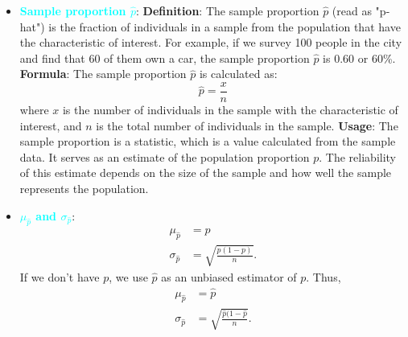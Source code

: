 \documentclass{report}
\begin{document}
\begin{itemize}
        \item \textbf{\textcolor{cyan}{Sample proportion $\hat{p}$}}:
            \textbf{Definition}: The sample proportion $\hat{p}$ (read as "p-hat") is the fraction of individuals in a sample from the population that have the characteristic of interest. For example, if we survey 100 people in the city and find that 60 of them own a car, the sample proportion $\hat{p}$ is 0.60 or 60\%.
            \bigbreak \noindent 
            \textbf{Formula}: The sample proportion $\hat{p}$ is calculated as:
            \[
                \hat{p} = \frac{x}{n}
            \]
            where $x$ is the number of individuals in the sample with the characteristic of interest, and $n$ is the total number of individuals in the sample.
            \bigbreak \noindent 
            \textbf{Usage}: The sample proportion is a statistic, which is a value calculated from the sample data. It serves as an estimate of the population proportion $p$. The reliability of this estimate depends on the size of the sample and how well the sample represents the population.
        \item \textbf{\textcolor{cyan}{$\mu_{\hat{p}}$ and $\sigma_{\hat{p}}$}}:
            \begin{align*}
                \mu_{\hat{p}} &= p \\
                \sigma_{\hat{p}} &= \sqrt{\frac{p(1-p)}{n}}
            .\end{align*}
            If we don't have $p$, we use $\hat{p}$ as an unbiased estimator of $p$. Thus,
            \begin{align*}
                \mu_{\hat{p}} &= \hat{p} \\
                \sigma_{\hat{p}} &= \sqrt{\frac{\hat{p}(1-\hat{p}}{n}}
            .\end{align*}


\end{itemize}
\end{document}
